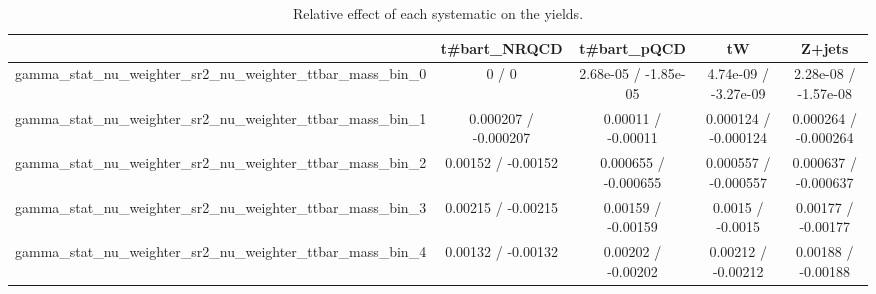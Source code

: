 \documentclass[10pt]{article}
\begin{document}
\begin{table}[htbp]
\begin{center}
\begin{tabular}{|c|c|c|c|c|}
\hline 
      & t#bar{t}_{NRQCD}      & t#bar{t}_{pQCD}      & tW      & Z+jets \\ 
\hline 
  gamma_stat_nu_weighter_sr2_nu_weighter_ttbar_mass_bin_0 & 0 / 0 & 2.68e-05 / -1.85e-05 & 4.74e-09 / -3.27e-09 & 2.28e-08 / -1.57e-08 \\ 
  gamma_stat_nu_weighter_sr2_nu_weighter_ttbar_mass_bin_1 & 0.000207 / -0.000207 & 0.00011 / -0.00011 & 0.000124 / -0.000124 & 0.000264 / -0.000264 \\ 
  gamma_stat_nu_weighter_sr2_nu_weighter_ttbar_mass_bin_2 & 0.00152 / -0.00152 & 0.000655 / -0.000655 & 0.000557 / -0.000557 & 0.000637 / -0.000637 \\ 
  gamma_stat_nu_weighter_sr2_nu_weighter_ttbar_mass_bin_3 & 0.00215 / -0.00215 & 0.00159 / -0.00159 & 0.0015 / -0.0015 & 0.00177 / -0.00177 \\ 
  gamma_stat_nu_weighter_sr2_nu_weighter_ttbar_mass_bin_4 & 0.00132 / -0.00132 & 0.00202 / -0.00202 & 0.00212 / -0.00212 & 0.00188 / -0.00188 \\ 
\hline 
\end{tabular} 
\caption{Relative effect of each systematic on the yields.} 
\end{center} 
\end{table} 
\end{document}
